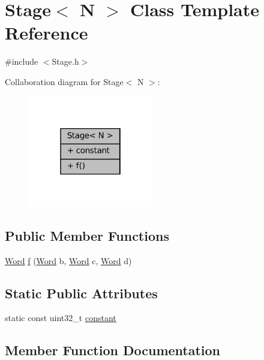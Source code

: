 \hypertarget{class_stage}{}\section{Stage$<$ N $>$ Class Template Reference}
\label{class_stage}


{\ttfamily \#include $<$Stage.\+h$>$}



Collaboration diagram for Stage$<$ N $>$\+:
\nopagebreak
\begin{figure}[H]
\begin{center}
\leavevmode
\includegraphics[width=154pt]{class_stage__coll__graph}
\end{center}
\end{figure}
\subsection*{Public Member Functions}
\begin{DoxyCompactItemize}
\item 
\mbox{\hyperlink{class_word}{Word}} \mbox{\hyperlink{class_stage_a5b27a573041c6a65a661ab1bbf1c6b42}{f}} (\mbox{\hyperlink{class_word}{Word}} b, \mbox{\hyperlink{class_word}{Word}} c, \mbox{\hyperlink{class_word}{Word}} d)
\end{DoxyCompactItemize}
\subsection*{Static Public Attributes}
\begin{DoxyCompactItemize}
\item 
static const uint32\+\_\+t \mbox{\hyperlink{class_stage_ab336683e1d732c61d4eb6a67c05b28db}{constant}}
\end{DoxyCompactItemize}


\subsection{Member Function Documentation}
\mbox{\label{class_stage_a5b27a573041c6a65a661ab1bbf1c6b42}} 
